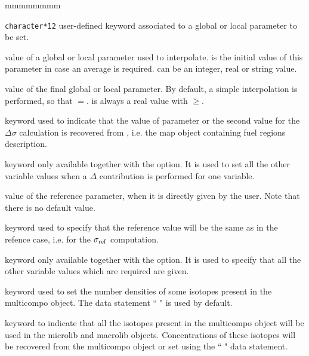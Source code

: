 \begin{ListeDeDescription}{mmmmmmmm}
\item[\dusa{PARKEY}] {\tt character*12} user-defined keyword associated to a global
or local parameter to be set.

\item[\dusa{val1}] value of a global or local parameter used to interpolate.   is the initial value of this parameter in case an average is required.  can be an integer, real or string value.

\item[\dusa{val2}] value of the final global or local parameter. By default, a simple interpolation is performed, so that $=$.  is always a real value with $\ge$.

\item[\moc{MAP}] keyword used to indicate that the value of parameter  or the second value for the $\Delta\sigma$ calculation is
recovered from , i.e. the {\sc map} object containing fuel regions description.

\item[\moc{REF}] keyword only available together with the  option. It is used to set all the other variable values when a $\Delta$ contribution is performed for one variable.  

\item[\dusa{valref}] value of the reference parameter, when it is directly given by the user. Note that there is no default value.

\item[\moc{SAMEASREF}] keyword used to specify that the reference value will be the same as in the refence case, i.e. for the $\sigma_{\rm ref}$ computation.

\item[\moc{ENDREF}] keyword only available together with the  option. It is used to specify that all the other variable values which are required are given.  

\item[\moc{MICRO}] keyword used to set the number densities of some isotopes present in the {\sc multicompo} object. The data statement `` " is used by default.

\item[\moc{ALL}] keyword to indicate that all the isotopes present in the  {\sc multicompo} object will be used in the {\sc microlib} and {\sc macrolib} objects. Concentrations of these isotopes will be recovered from the {\sc multicompo} object
or set using the `` " data statement.


\end{ListeDeDescription}
